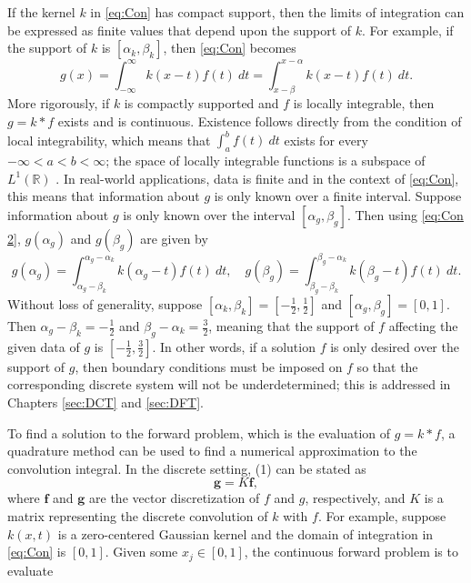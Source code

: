 \documentclass[12pt]{book}
\newcommand{\gVec}{\mathbf{g}}	%
\newcommand{\kMat}{K}	%
\newcommand{\fVec}{\mathbf{f}}	%
\begin{document}
If the kernel $k$ in \eqref{eq:Con} has compact support, then the limits of integration can be expressed as finite values that depend upon the support of $k$. For example, if the support of $k$ is $[\alpha_k,\beta_k]$, then \eqref{eq:Con} becomes
\begin{equation}
\label{eq:Con 2}
g(x) = \int_{-\infty}^{\infty} k(x-t)f(t) ~dt = \int_{x-\beta}^{x-\alpha} k(x-t)f(t) ~dt.
\end{equation} 
More rigorously, if $k$ is compactly supported and $f$ is locally integrable, then $g = k*f$ exists and is continuous. Existence follows directly from the condition of local integrability, which means that $\int_a^b f(t) ~dt$ exists for every $-\infty < a < b < \infty$; the space of locally integrable functions is a subspace of $L^1(\mathbb{R})$ \cite[p.~63]{DebnathLokenath1999ItHs}. In real-world applications, data is finite and in the context of \eqref{eq:Con}, this means that information about $g$ is only known over a finite interval. Suppose information about $g$ is only known over the interval $[\alpha_g,\beta_g]$. Then using \eqref{eq:Con 2}, $g(\alpha_g)$ and $g(\beta_g)$ are given by
\[g(\alpha_g) = \int_{\alpha_g-\beta_k}^{\alpha_g-\alpha_k} k(\alpha_g - t)f(t) ~dt, \quad g(\beta_g) = \int_{\beta_g - \beta_k}^{\beta_g - \alpha_k} k(\beta_g-t)f(t) ~dt.\]
Without loss of generality, suppose $[\alpha_k,\beta_k] = [-\frac{1}{2},\frac{1}{2}]$ and $[\alpha_g,\beta_g] = [0,1]$. Then $\alpha_g-\beta_k = -\frac{1}{2}$ and $\beta_g - \alpha_k = \frac{3}{2}$, meaning that the support of $f$ affecting the given data of $g$ is $[-\frac{1}{2},\frac{3}{2}]$. In other words, if a solution $f$ is only desired over the support of $g$, then boundary conditions must be imposed on $f$ so that the corresponding discrete system will not be underdetermined; this is addressed in Chapters \ref{sec:DCT} and \ref{sec:DFT}. \par 
To find a solution to the forward problem, which is the evaluation of $g = k * f$, a quadrature method can be used to find a numerical approximation to the convolution integral. In the discrete setting, (1) can be stated as
\begin{equation}
\gVec = \kMat\fVec,
\label{eq:Dis}
\end{equation}
where $\fVec$ and $\gVec$ are the vector discretization of $f$ and $g$, respectively, and $\kMat$ is a matrix representing the discrete convolution of $k$ with $f$. For example, suppose $k(x,t)$ is a zero-centered Gaussian kernel and the domain of integration in \eqref{eq:Con} is $[0,1]$. Given some $x_j \in [0,1]$, the continuous forward problem is to evaluate
\end{document}
